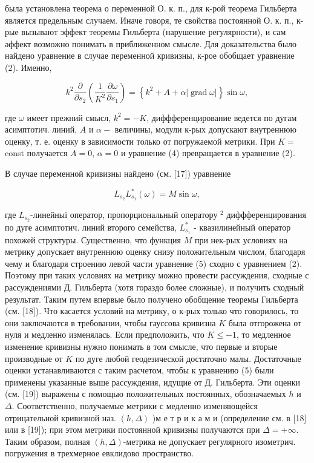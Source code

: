\documentclass[10pt]{article}
\begin{document}
была установлена теорема о переменной О. к. п., для к-рой теорема Гильберта является предельным случаем. Иначе говоря, те свойства постоянной О. к. п., к-рые вызывают эффект теоремы Гильберта (нарушение регулярности), и сам әффект возможно понимать в приближенном смысле. Для доказательства было найдено уравнение в случае переменной кривизны, к-рое обобщает уравнение (2). Именно,



\[

k^{2} \frac{\partial}{\partial s_{2}}\left(\frac{1}{K^{2}} \frac{\partial \omega}{\partial s_{1}}\right)=\left\{k^{2}+A+\alpha|\operatorname{grad} \omega|\right\} \sin \omega,

\]



где $\omega$ имеет прежний смысл, $k^{2}=-K$, диффференцирование ведется по дугам асимптотич. линий, $A$ и $\alpha-$ величины, модули к-рых допускают внутреннюю оценку, т. е. оценку в зависимости только от погружаемой метрики. При $K=$ const получается $A=0$, $\alpha=0$ и уравнение (4) превращается в уравнение (2).



В случае переменной кривизны найдено (см. [17]) уравнение



\[

L_{s_{2}} L_{s_{1}}^{*}(\omega)=M \sin \omega,

\]



где $L_{s_{2}}$-линейныї оператор, пропорциональный оператору $^{2}$ диффференцирования по дуге асимптотич. линий второго семейства, $L_{s_{1}}^{*}$ - квазилинейный оператор похожей структуры. Существенно, что функция $M$ при нек-рых условиях на метрику допускает внутреннюю оценку снизу положительным числом, благодаря чему и благодаря строению левой части уравнение (5) сходно с уравнением (2). Поэтому при таких условиях на метрику можно провести рассуждения, сходные с рассуждениями Д. Гильберта (хотя гораздо более сложные), и получить сходный результат. Таким путем впервые было получено обобщение теоремы Гильберта (см. [18]). Что касается условий на метрику, о к-рых только что говорилось, то они заключаются в требовании, чтобы гауссова кривизна $K$ была отгорожена от нуля и медленно изменялась. Если предположить, что $K \leqslant-1$, то медленное изменение кривизны нужно понимать в том смысле, что первые и вторые производные от $K$ по дуге любой геодезической достаточно малы. Достаточные оценки устанавливаются с таким расчетом, чтобы к уравнению (5) были применены указанные выше рассуждения, идущие от Д. Гильберта. Эти оценки (см. [19]) выражены с помощью положительных постоянных, обозначаемых $h$ и $\Delta$. Соответственно, получаемые метрики с медленно изменяющейся отрицательной кривизной наз. $(h, \Delta)$ )м е т р и к а м и (определение см. в [18] или в [19]); при этом метрики постоянной кривизны получаются при $\Delta=+\infty$. Таким образом, полная $(h, \Delta)$-метрика не допускает регулярного изометрич. погружения в трехмерное евклидово пространство.
\end{document}

